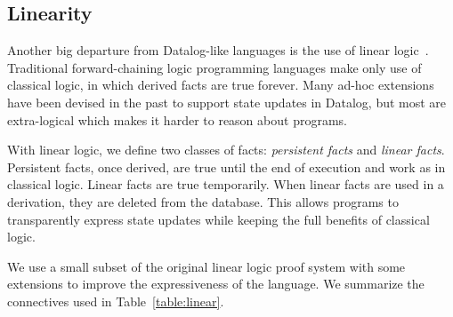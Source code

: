 \subsection{Linearity}

Another big departure from Datalog-like languages is the use of linear logic~\cite{Girard95logic:its}. Traditional forward-chaining logic programming languages make only use of classical logic, in which derived facts are true forever. Many ad-hoc extensions~\cite{Liu98extendingdatalog,Ludascher95alogical} have been devised in the past to support state updates in Datalog, but most are extra-logical which makes it harder to reason about programs.

With linear logic, we define two classes of facts: \emph{persistent facts} and \emph{linear facts}. Persistent facts, once derived, are true until the end of execution and work as in classical logic. Linear facts are true temporarily. When linear facts are used in a derivation, they are deleted from the database. This allows programs to transparently express state updates while keeping the full benefits of classical logic.

We use a small subset of the original linear logic proof system with some extensions to improve
the expressiveness of the language. We summarize the connectives used in Table~\ref{table:linear}.

\begin{table}
   \begin{center}
\end{center}
\caption{Connectives from Linear Logic used in \lang.}
\label{table:linear}
\end{table}

